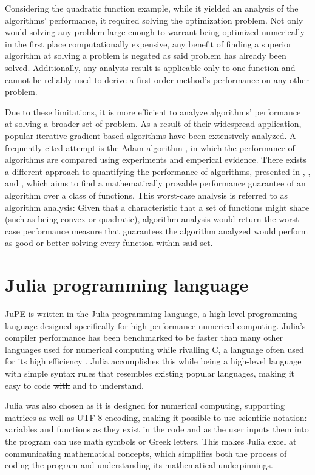 Considering the quadratic function example, while it yielded an analysis of the algorithms' performance, it required solving the optimization problem. Not only would solving any problem large enough to warrant being optimized numerically in the first place computationally expensive, any benefit of finding a superior algorithm at solving a problem is negated as said problem has already been solved. Additionally, any analysis result is applicable only to one function and cannot be reliably used to derive a first-order method's performance on any other problem.

Due to these limitations, it is more efficient to analyze algorithms' performance at solving a broader set of problem. As a result of their widespread application, popular iterative gradient-based algorithms have been extensively analyzed. A frequently cited attempt is the Adam algorithm \cite{adam}, in which the performance of algorithms are compared using experiments and emperical evidence. There exists a different approach to quantifying the performance of algorithms, presented in \cite{drori2012}, \cite{taylor2016}, and \cite{lessard2016}, which aims to find a mathematically provable performance guarantee of an algorithm over a class of functions. This worst-case analysis is referred to as algorithm analysis: Given that a characteristic that a set of functions might share (such as being convex or quadratic), algorithm analysis would return the worst-case performance measure that guarantees the algorithm analyzed would perform as good or better  solving every function within said set.

\section{Julia programming language}

JuPE is written in the Julia programming language, a high-level programming language designed specifically for high-performance numerical computing. Julia's compiler performance has been benchmarked to be faster than many other languages used for numerical computing while rivalling C, a language often used for its high efficiency \cite{julia}. Julia accomplishes this while being a high-level language with simple syntax rules that resembles existing popular languages, making it easy to code \sout{with} and to understand.

Julia was also chosen as it is designed for numerical computing, supporting matrices as well as UTF-8 encoding, making it possible to use scientific notation: variables and functions as they exist in the code and as the user inputs them into the program can use math symbols or Greek letters. This makes Julia excel at communicating mathematical concepts, which simplifies both the process of coding the program and understanding its mathematical underpinnings.

